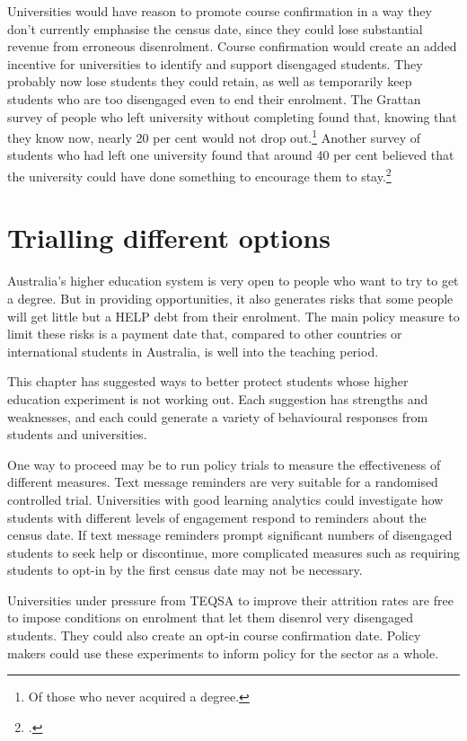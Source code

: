 Universities would have reason to promote course confirmation in a way they don't currently emphasise the census date, since they could lose substantial revenue from erroneous disenrolment. Course confirmation would create an added incentive for universities to identify and support disengaged students. They probably now lose students they could retain, as well as temporarily keep students who are too disengaged even to end their enrolment. The Grattan survey of people who left university without completing found that, knowing that they know now, nearly 20 per cent would not drop out.\footnote{Of those who never acquired a degree.} 
Another survey of students who had left one university found that around 40 per cent believed that the university could have done something to encourage them to stay.\footcite[][35]{Harvey2017a}

\section{Trialling different options}\label{sec:8.5}

Australia's higher education system is very open to people who want to try to get a degree. But in providing opportunities, it also generates risks that some people will get little but a HELP debt from their enrolment. The main policy measure to limit these risks is a payment date that, compared to other countries or international students in Australia, is well into the teaching period.

This chapter has suggested ways to better protect students whose higher education experiment is not working out. Each suggestion has strengths and weaknesses, and each could generate a variety of behavioural responses from students and universities.

One way to proceed may be to run policy trials to measure the effectiveness of different measures. Text message reminders are very suitable for a randomised controlled trial. Universities with good learning analytics could investigate how students with different levels of engagement respond to reminders about the census date. If text message reminders prompt significant numbers of disengaged students to seek help or discontinue, more complicated measures such as requiring students to opt-in by the first census date may not be necessary.

Universities under pressure from TEQSA to improve their attrition rates are free to impose conditions on enrolment that let them disenrol very disengaged students. They could also create an opt-in course confirmation date. Policy makers could use these experiments to inform policy for the sector as a whole.